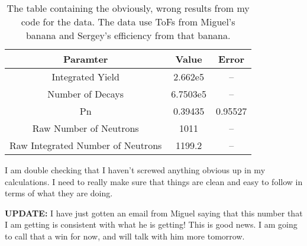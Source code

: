 \begin{table}[htbp]
  \caption{The table containing the obviously, wrong results from my code 
    for the  data. The data use ToFs from Miguel's banana and 
    Sergey's efficiency from that banana.}
  \label{tbl:ga84-mmf-wrong}
  \begin{center}
    \begin{tabular}{|c|c|c|}
      \hline
      Paramter & Value & Error\\\hline
      Integrated Yield & 2.662e5 & --\\\hline
      Number of Decays & 6.7503e5 & --\\\hline
      Pn & 0.39435 & 0.95527\\\hline
      Raw Number of Neutrons & 1011 & --\\\hline
      Raw Integrated Number of Neutrons & 1199.2 & --\\\hline
    \end{tabular}
  \end{center}
\end{table}

I am double checking that I haven't screwed anything obvious up in my 
calculations. I need to really make sure that things are clean and easy to 
follow in terms of what they are doing. 

\textbf{UPDATE: } I have just gotten an email from Miguel saying that this number
that I am getting is consistent with what he is getting! This is good news. I 
am going to call that a win for now, and will talk with him more tomorrow.
